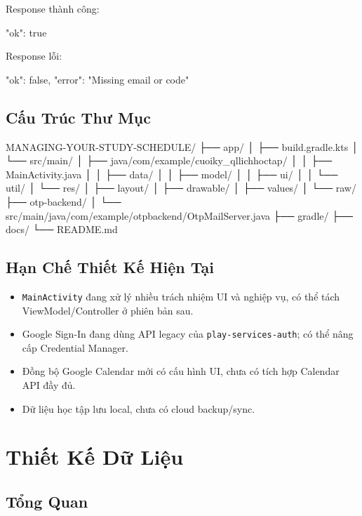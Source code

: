 \documentclass[12pt,a4paper]{report}
\begin{document}
Response thành công:

\begin{CodeBlock}
{"ok": true}
\end{CodeBlock}

Response lỗi:

\begin{CodeBlock}
{
  "ok": false,
  "error": "Missing email or code"
}
\end{CodeBlock}

\section{Cấu Trúc Thư Mục}

\begin{CodeBlock}
MANAGING-YOUR-STUDY-SCHEDULE/
├── app/
│   ├── build.gradle.kts
│   └── src/main/
│       ├── java/com/example/cuoiky_qllichhoctap/
│       │   ├── MainActivity.java
│       │   ├── data/
│       │   ├── model/
│       │   ├── ui/
│       │   └── util/
│       └── res/
│           ├── layout/
│           ├── drawable/
│           ├── values/
│           └── raw/
├── otp-backend/
│   └── src/main/java/com/example/otpbackend/OtpMailServer.java
├── gradle/
├── docs/
└── README.md
\end{CodeBlock}

\section{Hạn Chế Thiết Kế Hiện Tại}

\begin{itemize}
\item \texttt{MainActivity} đang xử lý nhiều trách nhiệm UI và nghiệp vụ, có thể tách ViewModel/Controller ở phiên bản sau.
\item Google Sign-In đang dùng API legacy của \texttt{play-services-auth}; có thể nâng cấp Credential Manager.
\item Đồng bộ Google Calendar mới có cấu hình UI, chưa có tích hợp Calendar API đầy đủ.
\item Dữ liệu học tập lưu local, chưa có cloud backup/sync.
\end{itemize}
\clearpage
\chapter{Thiết Kế Dữ Liệu}

\section{Tổng Quan}
\end{document}
